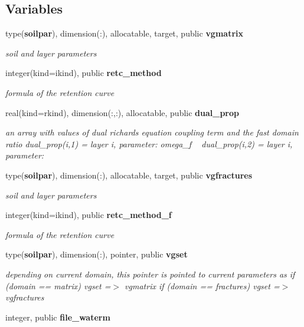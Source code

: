 \subsection*{Variables}
\begin{DoxyCompactItemize}
\item 
type({\bf soilpar}), dimension(\+:), allocatable, target, public {\bf vgmatrix}
\begin{DoxyCompactList}\small\item\em soil and layer parameters \end{DoxyCompactList}\item 
integer(kind=ikind), public {\bf retc\+\_\+method}
\begin{DoxyCompactList}\small\item\em formula of the retention curve \end{DoxyCompactList}\item 
real(kind=rkind), dimension(\+:,\+:), allocatable, public {\bf dual\+\_\+prop}
\begin{DoxyCompactList}\small\item\em an array with values of dual richards equation coupling term and the fast domain ratio dual\+\_\+prop(i,1) = layer i, parameter\+: omega\+\_\+f ~\newline
 dual\+\_\+prop(i,2) = layer i, parameter\+: \end{DoxyCompactList}\item 
type({\bf soilpar}), dimension(\+:), allocatable, target, public {\bf vgfractures}
\begin{DoxyCompactList}\small\item\em soil and layer parameters \end{DoxyCompactList}\item 
integer(kind=ikind), public {\bf retc\+\_\+method\+\_\+f}
\begin{DoxyCompactList}\small\item\em formula of the retention curve \end{DoxyCompactList}\item 
type({\bf soilpar}), dimension(\+:), pointer, public {\bf vgset}
\begin{DoxyCompactList}\small\item\em depending on current domain, this pointer is pointed to current parameters as if (domain == matrix) vgset =$>$ vgmatrix if (domain == fractures) vgset =$>$ vgfractures \end{DoxyCompactList}\item 
integer, public {\bf file\+\_\+waterm}
\end{DoxyCompactItemize}


